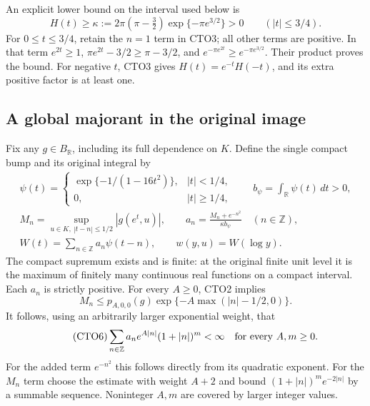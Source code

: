 An explicit lower bound on the interval used below is
\begin{equation}\tag{CTO4}
H(t)\ge\kappa:=2\pi(\pi-\tfrac32)
                  \exp\{-\pi e^{3/2}\}>0
\qquad(|t|\le3/4).
\end{equation}
For $0\le t\le3/4$, retain the $n=1$ term in CTO3; all other
terms are positive. In that term $e^{2t}\ge1$,
$\pi e^{2t}-3/2\ge\pi-3/2$, and
$e^{-\pi e^{2t}}\ge e^{-\pi e^{3/2}}$. Their product proves
the bound. For negative $t$, CTO3 gives $H(t)=e^{-t}H(-t)$,
and its extra positive factor is at least one.

\subsection{A global majorant in the original image}

Fix any $g\in B_{\mathbb R}$, including its full dependence on $K$.
Define the single compact bump and its original integral by
\begin{equation}\tag{CTO5}
\begin{gathered}
\psi(t)=
\begin{cases}
\exp\{-1/(1-16t^2)\},&|t|<1/4,\\
0,&|t|\ge1/4,
\end{cases}\qquad b_\psi=\int_{\mathbb R}\psi(t)\,dt>0,\\
M_n=\sup_{u\in K,\ |t-n|\le1/2}|g(e^t,u)|,\qquad
a_n=\frac{M_n+e^{-n^2}}{\kappa b_\psi}\quad(n\in\mathbb Z),\\
W(t)=\sum_{n\in\mathbb Z}a_n\psi(t-n),\qquad
w(y,u)=W(\log y).
\end{gathered}
\end{equation}
The compact supremum exists and is finite: at the original finite
unit level it is the maximum of finitely many continuous real
functions on a compact interval. Each $a_n$ is strictly positive.
For every $A\ge0$, CTO2 implies
\[
M_n\le p_{A,0,0}(g)
      \exp\{-A\max(|n|-1/2,0)\}.
\]
It follows, using an arbitrarily larger exponential weight, that
\begin{equation}\tag{CTO6}
\sum_{n\in\mathbb Z}a_n e^{A|n|}(1+|n|)^m<\infty
\quad\hbox{for every }A,m\ge0.
\end{equation}
For the added term $e^{-n^2}$ this follows directly from its
quadratic exponent. For the $M_n$ term choose the estimate with
weight $A+2$ and bound $(1+|n|)^m e^{-2|n|}$ by a summable
sequence. Noninteger $A,m$ are covered by larger integer values.

